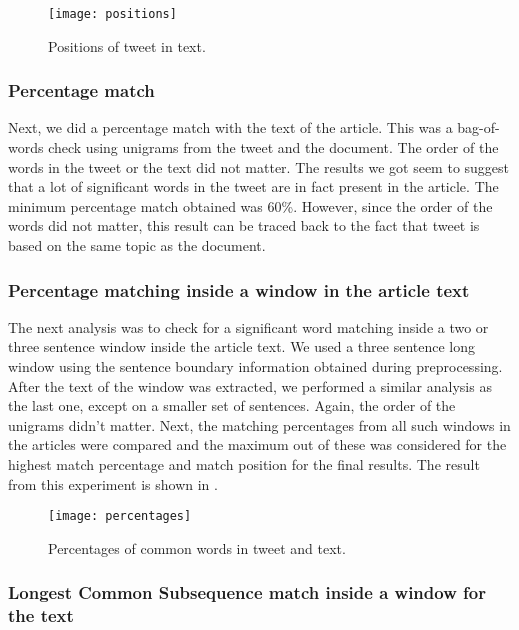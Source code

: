 \begin{figure}[htbp]
\centering
\texttt{[image: positions]}
\caption{Positions of tweet in text.}
\label{fig:positions}
\end{figure}


\subsubsection{Percentage match}

Next, we did a percentage match with the text of the article. This was a bag-of-words check using unigrams from the tweet and the document. The order of the words in the tweet or the text did not matter. The results we got seem to suggest that a lot of significant words in the tweet are in fact present in the article. The minimum percentage match obtained was 60\%. However, since the order of the words did not matter, this result can  be traced back to the fact that tweet is based on the same topic as the document. 

\subsubsection{Percentage matching inside a window in the article text}

The next analysis was to check for a significant word matching inside a two or three sentence window inside the article text. We used a three sentence long window using the sentence boundary information obtained during preprocessing. After the text of the window was extracted, we performed a similar analysis as the last one, except on a smaller set of sentences. Again, the order of the unigrams didn't matter. Next, the matching percentages from all such windows in the articles were compared and the maximum out of these was considered for the highest match percentage and match position for the final results. The result from this experiment is shown in . 

\begin{figure}[htbp]
\centering
\texttt{[image: percentages]}
\caption{Percentages of common words in tweet and text.}
\label{fig:percentages}
\end{figure}

\subsubsection{Longest Common Subsequence match inside a window for the text}

